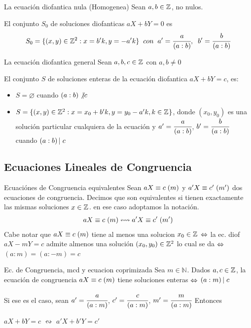 \documentclass[10pt]{article}
\newcommand{\nat}[1]{\mathbb{N}^{#1}}
\begin{document}
\begin{propo}{La ecuación diofantica nula (Homogenea)}
 Sean $a,b \in \entero{}$, no nulos.
 
 El conjunto $S_0$ de soluciones diofanticas $aX + bY =0$ es
 \[S_0 = \{(x,y) \in \entero{2} : x = b'k, y = -a'k\} \es{0.2} con \es{0.2} a' = \cfrac{a}{(a:b)}, \es{0.2} b' = \cfrac{b}{(a:b)}\]
\end{propo}

\begin{teo}{La ecuación diofantica general}
  Sean $a,b,c \in \entero{}$ con $a,b \neq 0$
  
  El conjunto $S$ de soluciones enteras de la ecuación diofantica $aX + bY = c$, es:
  \begin{itemize}
   \item $S = \varnothing$ cuando $(a:b) \not\vert c$
   \item $S = \{(x,y) \in \entero{2} : x = x_0 + b'k, y = y_0 - a'k , k\in \entero{}\}$, donde $(x_0,y_0)$ es una solución particular cualquiera de la ecuación y $a' = \cfrac{a}{(a:b)}$,  $b' = \cfrac{b}{(a:b)}$ cuando $\divi{(a:b)}{c}$
  \end{itemize}
\end{teo}
\begin{center}
\subsection{Ecuaciones Lineales de Congruencia} 
\end{center}

\begin{defi}{Ecuaciónes de Congruencia equivalentes}
 Sean $\congruente{aX}{c}{m}$ y $\congruente{a'X}{c'}{m'}$ dos ecuaciones de congruencia. Decimos que son equivalentes si tienen exactamente las mismas soluciones $x \in \entero{}$. en ese caso adoptamos la notación.
 \[\congruente{aX}{c}{m} \leftrightsquigarrow \congruente{a'X}{c'}{m'}\]
 Cabe notar que $\congruente{aX}{c}{m}$ tiene al menos una solucion $x_0 \in \entero{}$ $\sii$ la ec. diof $aX - mY=c$ admite almenos una solución $(x_0,y_0) \in \entero{2}$ lo cual se da $\sii$ $(a:m)=(a:-m)=c$ 
\end{defi}

\begin{propo}{Ec. de Congruencia, mcd y ecuacion coprimizada}
 Sea $m \in \nat{}$. Dados $a,c \in \entero{}$, la ecuación de congruencia $\congruente{aX}{c}{m}$ tiene soluciones enteras $\sii$ $\divi{(a:m)}{c}$
 
 Si ese es el caso, sean $a' = \cfrac{a}{(a:m)}$, $c' = \cfrac{c}{(a:m)}$, $m' = \cfrac{m}{(a:m)}$
Entonces
 \begin{center}
   $aX + bY =c$ $\leftrightsquigarrow$ $a'X + b'Y =c'$
  \end{center}
 \end{propo}
\end{document}
